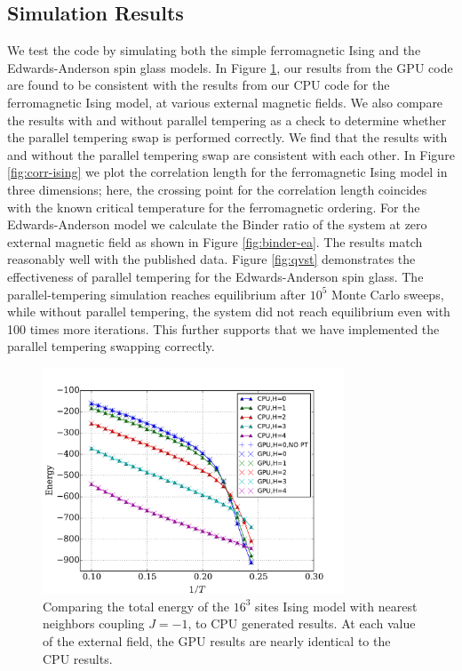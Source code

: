 \subsection{Simulation Results}
\label{section_result}

We test the code by simulating  both the simple ferromagnetic
Ising and the Edwards-Anderson spin glass models.  In Figure
\ref{fig:energy-ising}, our results from the GPU code are found to be
consistent with the results from our CPU code for the ferromagnetic
Ising model, at various external magnetic fields. We also compare the
results with and without parallel tempering as a check to determine
whether the parallel tempering swap is performed correctly. We find
that the results with and without the parallel tempering swap are
consistent with each other. In Figure \ref{fig:corr-ising} we plot
the correlation length for the ferromagnetic Ising model in three
dimensions; here, the crossing point for the correlation length coincides
with the known critical temperature for the ferromagnetic
ordering. \cite{PhysRevB.44.5081}
For the Edwards-Anderson model we calculate the Binder ratio
of the system at zero external magnetic field as shown in Figure
\ref{fig:binder-ea}. The results match reasonably well with the
published data. \cite{2006PhRvB..73v4432K} Figure \ref{fig:qvst} demonstrates the effectiveness
of parallel tempering for the Edwards-Anderson spin glass. The
parallel-tempering simulation reaches equilibrium after $10^5$ Monte
Carlo sweeps, while without parallel tempering, the system did not
reach equilibrium even with 100 times more iterations. This further
supports that we have implemented the parallel tempering swapping
correctly.

\begin{figure}[ht!]
    \centering
    \includegraphics[width=0.8\textwidth]{img/energy_compare.pdf}
    \caption{Comparing the total energy of the $16^3$ sites Ising model with nearest neighbors coupling $J=-1$, to CPU generated results. At each value of 
      the external field, the GPU results are nearly identical to the CPU results. }
    \label{fig:energy-ising}
    \end{figure}

